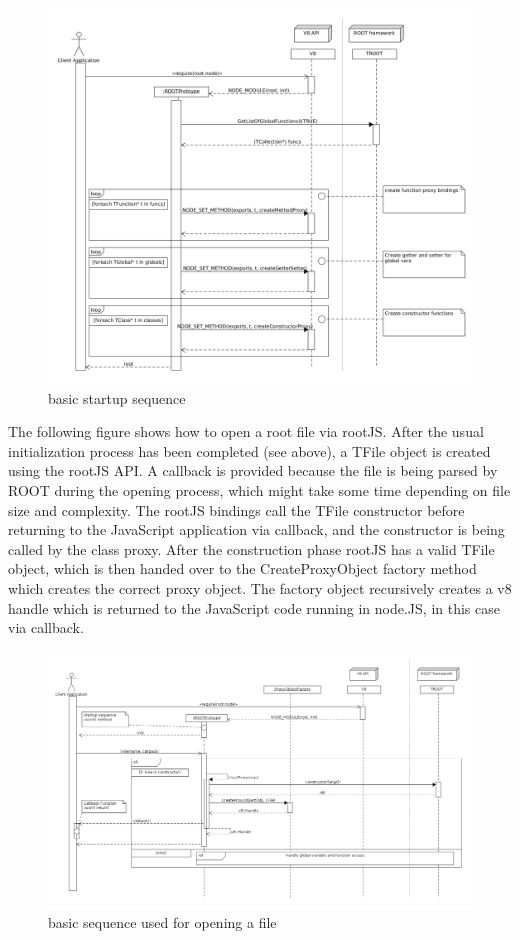 \begin{figure}[htb]
	\centering
	\includegraphics[width=18cm]{./latex/resources/startupSequence.png}
	\caption{basic startup sequence}
\end{figure}
\pagebreak
The following figure shows how to open a root file via rootJS. After the usual initialization process has been completed (see above), a TFile object is created using the rootJS API. A callback is provided because the file is being parsed by ROOT during the opening process, which might take some time depending on file size and complexity. The rootJS bindings call the TFile constructor before returning to the JavaScript application via callback, and the constructor is being called by the class proxy. After the construction phase rootJS has a valid TFile object, which is then handed over to the CreateProxyObject factory method which creates the correct proxy object. The factory object recursively creates a v8 handle which is returned to the JavaScript code running in node.JS, in this case via callback.
\begin{figure}[htb]
	\centering
	\includegraphics[width=18cm]{./latex/resources/fileOpen.png}
	\caption{basic sequence used for opening a file}
\end{figure}
